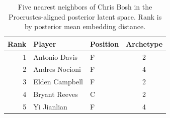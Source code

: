 \begin{table}[htbp]
  \centering\small
  \begin{tabular}{rllc}
    \toprule
    Rank & Player & Position & Archetype \\
    \midrule
    1 & Antonio Davis & F & 2 \\
    2 & Andres Nocioni & F & 4 \\
    3 & Elden Campbell & F & 2 \\
    4 & Bryant Reeves & C & 2 \\
    5 & Yi Jianlian & F & 4 \\
    \bottomrule
  \end{tabular}
  \caption{Five nearest neighbors of Chris Bosh in the Procrustes-aligned posterior latent space. Rank is by posterior mean embedding distance.}
  \label{tab:Chris_Bosh_neighbors}
\end{table}

